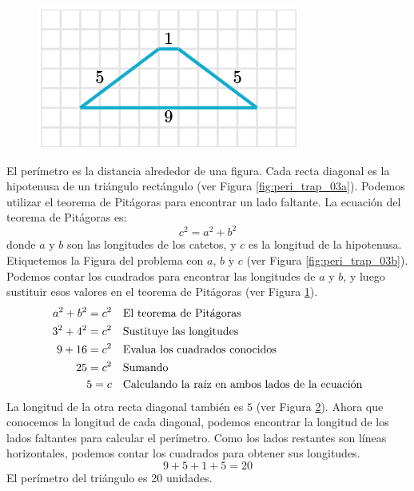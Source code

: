 \begin{solutionbox}{16cm}
\begin{minipage}{0.3\textwidth}
\begin{figure}[H]
            \caption{}
            \label{fig:peri_trap_03c}
        \end{figure}
        \begin{figure}[H]
            \centering
            \includegraphics[width=0.6\linewidth]{../images/peri_trap_03d.png}
            \caption{}
            \label{fig:peri_trap_03d}
        \end{figure}
    \end{minipage}\hfill
    \begin{minipage}{0.65\textwidth}
        El perímetro es la distancia alrededor de una figura.
        Cada recta diagonal es la hipotenusa de un triángulo rectángulo (ver Figura \ref{fig:peri_trap_03a}).
        Podemos utilizar el teorema de Pitágoras para encontrar un lado faltante.
        La ecuación del teorema de Pitágoras es:
        \[c^2=a^2+b^2\]
        donde $a$ y $b$ son las longitudes de los catetos, y $c$ es la longitud de la hipotenusa.
        Etiquetemos la Figura del problema con $a$, $b$ y $c$ (ver Figura \ref{fig:peri_trap_03b}).
        Podemos contar los cuadrados para encontrar las longitudes de $a$ y $b$, y luego sustituir esos valores en el teorema de Pitágoras (ver Figura \ref{fig:peri_trap_03c}).
        \begin{align*}
            a^2+b^2  =c^2 & \text{\quad El teorema de Pitágoras}                          \\
            3^2+4^2  =c^2 & \text{\quad Sustituye las longitudes}                         \\
            9 +16 =c^2    & \text{\quad Evalua los cuadrados conocidos}                   \\
            25=c^2        & \text{\quad Sumando }                                         \\
            5=c           & \text{\quad Calculando la raíz en ambos lados de la ecuación} \\
        \end{align*}
        La longitud de la otra recta diagonal también es $5$ (ver Figura \ref{fig:peri_trap_03d}).
        Ahora que conocemos la longitud de cada diagonal, podemos encontrar la longitud de los lados faltantes para calcular el perímetro.
        Como los lados restantes son líneas horizontales, podemos contar los cuadrados para obtener sus longitudes.
        \[9+5+1+5=20\]
        El perímetro del triángulo es 20 unidades.
    \end{minipage}
\end{solutionbox}
